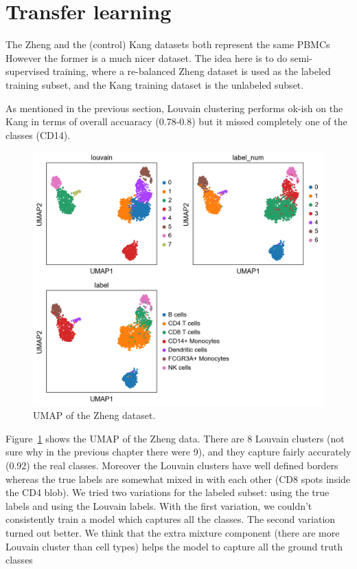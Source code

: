 \documentclass[11pt, a4paper]{report}
\theoremstyle{plain}
\theoremstyle{definition}
\theoremstyle{remark}
\begin{document}
\section{Transfer learning}

The Zheng and the (control) Kang datasets both represent the same PBMCs
However the former is a much nicer dataset.
The idea here is to do semi-supervised training, where a re-balanced Zheng
dataset is used as the labeled training subset, and the Kang training dataset is the
unlabeled subset.

As mentioned in the previous section, Louvain clustering performs ok-ish on the
Kang in terms of overall accuaracy (0.78-0.8) but it missed completely
one of the classes (CD14).

\begin{figure}[h]
\centering
\includegraphics[width=1.1\textwidth]{images/gmmvae_zheng_new_louvain_umap1.png}
\caption{
UMAP of the Zheng dataset.
}
\label{fig:zheng_pca_umap_new}
\end{figure}

Figure~\ref{fig:zheng_pca_umap_new} shows the UMAP of the Zheng data. There are
8 Louvain clusters (not sure why in the previous chapter there were 9), and they
capture fairly accurately (0.92) the real classes. Moreover the Louvain clusters
have well defined borders whereas the true labels are somewhat mixed in with
each other (CD8 spots inside the CD4 blob). We tried two variations for the
labeled subset: using the true labels and using the Louvain labels. With the
first variation, we couldn't consistently train a model which captures all the
classes. The second variation turned out better. We think that the extra mixture
component (there are more Louvain cluster than cell types) helps the model to
capture all the ground truth classes
\end{document}
